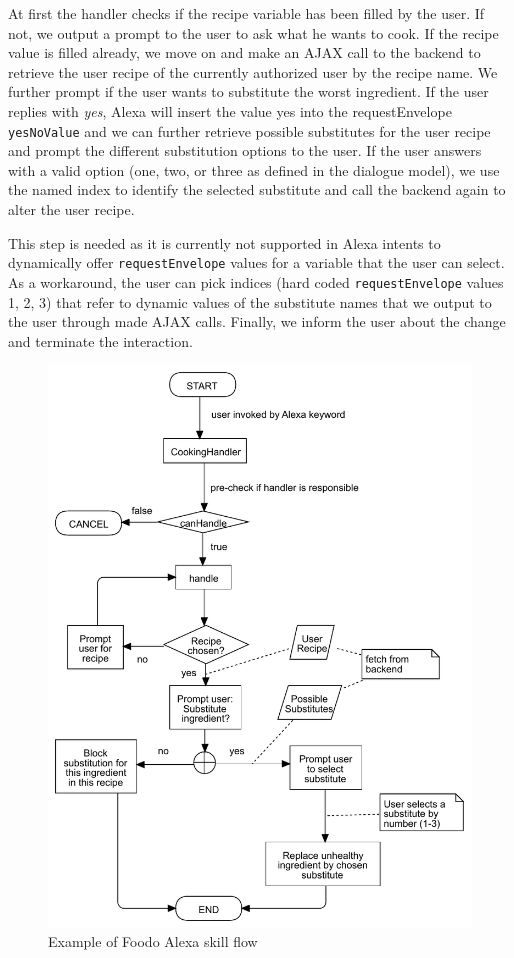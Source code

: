 At first the handler checks if the recipe variable has been filled by the user. If not, we output a prompt to the user to ask what he wants to cook. If the recipe value is filled already, we move on and make an AJAX call to the backend to retrieve the user recipe of the currently authorized user by the recipe name. We further prompt if the user wants to substitute the worst ingredient. If the user replies with \textit{yes}, Alexa will insert the value yes into the requestEnvelope \texttt{yesNoValue} and we can further retrieve possible substitutes for the user recipe and prompt the different substitution options to the user. If the user answers with a valid option (one, two, or three as defined in the dialogue model), we use the named index to identify the selected substitute and call the backend again to alter the user recipe. 

This step is needed as it is currently not supported in Alexa intents to dynamically offer \texttt{requestEnvelope} values for a variable that the user can select. As a workaround, the user can pick indices (hard coded \texttt{requestEnvelope} values 1, 2, 3) that refer to dynamic values of the substitute names that we output to the user through made AJAX calls. Finally, we inform the user about the change and terminate the interaction. 

\begin{figure}[ht]
	\captionsetup{justification=centering}
	\begin{center}
	\includegraphics[scale=0.6]{Ressourcen/img/alexa-flow}
	\caption{Example of Foodo Alexa skill flow}
\end{center}
\end{figure}

